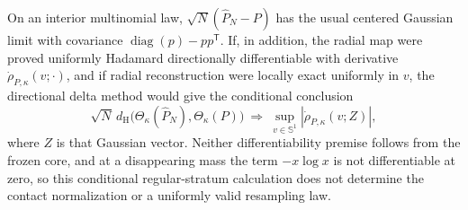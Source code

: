 On an interior multinomial law, \(\sqrt N(\widehat P_N-P)\) has the usual centered Gaussian limit with covariance \(\operatorname{diag}(p)-pp^{\mathsf T}\).  If, in addition, the radial map were proved uniformly Hadamard directionally differentiable with derivative \(\dot\rho_{P,\kappa}(v;\cdot)\), and if radial reconstruction were locally exact uniformly in \(v\), the directional delta method would give the conditional conclusion
\[
 \sqrt N\,d_{\mathrm H}\bigl(\Theta_\kappa(\widehat P_N),\Theta_\kappa(P)\bigr)
 \ \Longrightarrow\ 
 \sup_{v\in\mathbb S^1}\left|\dot\rho_{P,\kappa}(v;Z)\right|,
\]
where \(Z\) is that Gaussian vector.  Neither differentiability premise follows from the frozen core, and at a disappearing mass the term \(-x\log x\) is not differentiable at zero, so this conditional regular-stratum calculation does not determine the contact normalization or a uniformly valid resampling law.